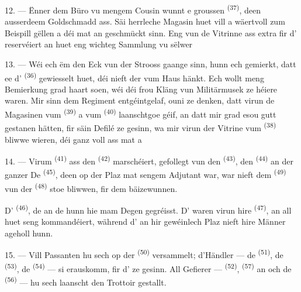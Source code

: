12. --- Ënner dem Büro vu mengem Cousin wunnt e groussen
 \textsuperscript{(37)}, deen ausserdeem Goldschmadd
ass. Säi herrleche Magasin huet vill 
 a wäertvoll  zum Beispill
 gëllen  a  déi mat
 an  geschmückt sinn. Eng vun de Vitrinne
ass extra fir d' reservéiert an huet eng wichteg Sammlung vu
sëlwer 

13. --- Wéi ech ëm den Eck vun der Strooss gaange sinn, hunn ech gemierkt, datt ee
d' \textsuperscript{(36)} gewiesselt huet, déi nieft der
 vum Haus hänkt. Ech wollt meng Bemierkung grad haart soen, wéi déi
frou Kläng vun  Militärmusek ze héiere waren. Mir sinn dem Regiment
entgéintgelaf, ouni ze denken, datt  virun de Magasinen vum
 \textsuperscript{(39)} a vum 
\textsuperscript{(40)} laanschtgoe géif, an datt mir grad esou gutt gestanen hätten,
fir säin Defilé ze gesinn, wa mir virun der Vitrine vum 
\textsuperscript{(38)} bliwwe wieren, déi ganz voll ass mat  a 

\VUsaut{3.0mm}

14. --- Virum  \textsuperscript{(41)} ass den
 \textsuperscript{(42)} marschéiert, gefollegt vun den
 \textsuperscript{(43)}, den 
\textsuperscript{(44)} an der ganzer  De 
\textsuperscript{(45)}, deen op der Plaz mat sengem Adjutant war, war nieft dem
 \textsuperscript{(49)} vun der 
\textsuperscript{(48)} stoe bliwwen, fir dem  bäizewunnen.

D' \textsuperscript{(46)}, de  an de
 hunn hie mam Degen gegréisst. D' waren
virun hire  \textsuperscript{(47)}, an all  huet
seng  kommandéiert, während d'
 an  hir gewéinlech Plaz nieft hire
Männer ageholl hunn.

15. --- Vill Passanten hu sech op der  \textsuperscript{(50)}
versammelt; d'Händler --- de  \textsuperscript{(51)}, de
 \textsuperscript{(53)}, de 
\textsuperscript{(54)} --- si erauskomm, fir d' ze gesinn. All
Gefierer ---  \textsuperscript{(52)}, 
\textsuperscript{(57)} an och de  \textsuperscript{(56)} --- hu
sech laanscht den Trottoir gestallt.

